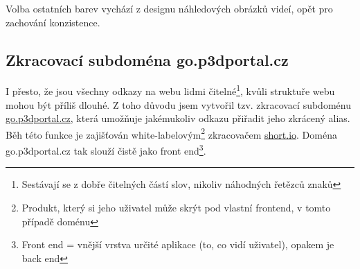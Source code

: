 Volba ostatních barev vychází z designu náhledových obrázků videí, opět pro zachování konzistence.

\subsection{Zkracovací subdoména go.p3dportal.cz}
I přesto, že jsou všechny odkazy na webu lidmi čitelné\footnote{Sestávají se z dobře čitelných částí slov, nikoliv náhodných řetězců znaků}, kvůli struktuře webu mohou být příliš dlouhé.
Z toho důvodu jsem vytvořil tzv. zkracovací subdoménu \href{https://go.p3dportal.cz}{go.p3dportal.cz}, která umožňuje jakémukoliv odkazu přiřadit jeho zkrácený alias.
Běh této funkce je zajišťován white-labelovým\footnote{Produkt, který si jeho uživatel může skrýt pod vlastní frontend, v tomto případě doménu} zkracovačem \href{https://short.io}{short.io}.
Doména go.p3dportal.cz tak slouží čistě jako front end\footnote{Front end = vnější vrstva určité aplikace (to, co vidí uživatel), opakem je back end}.

